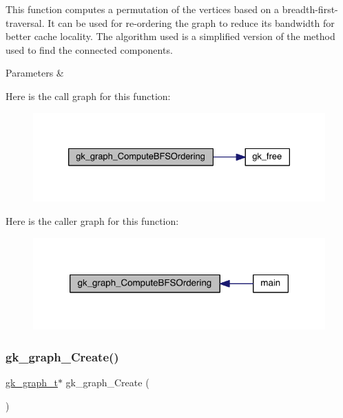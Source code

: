 This function computes a permutation of the vertices based on a breadth-\/first-\/traversal. It can be used for re-\/ordering the graph to reduce its bandwidth for better cache locality. The algorithm used is a simplified version of the method used to find the connected components.


\begin{DoxyParams}{Parameters}
{\em } & \\
\hline
\end{DoxyParams}
Here is the call graph for this function\+:\nopagebreak
\begin{figure}[H]
\begin{center}
\leavevmode
\includegraphics[width=330pt]{a00846_afc3115833e0ad293dbe9fd4028b12f20_cgraph}
\end{center}
\end{figure}
Here is the caller graph for this function\+:\nopagebreak
\begin{figure}[H]
\begin{center}
\leavevmode
\includegraphics[width=318pt]{a00846_afc3115833e0ad293dbe9fd4028b12f20_icgraph}
\end{center}
\end{figure}
\mbox{\label{a00846_a0d092a371d797437de53ae1a64bd78f4}} 
\subsubsection{\texorpdfstring{gk\+\_\+graph\+\_\+\+Create()}{gk\_graph\_Create()}}
{\footnotesize\ttfamily \hyperlink{a00638}{gk\+\_\+graph\+\_\+t}$\ast$ gk\+\_\+graph\+\_\+\+Create (\begin{DoxyParamCaption}{ }\end{DoxyParamCaption})}

